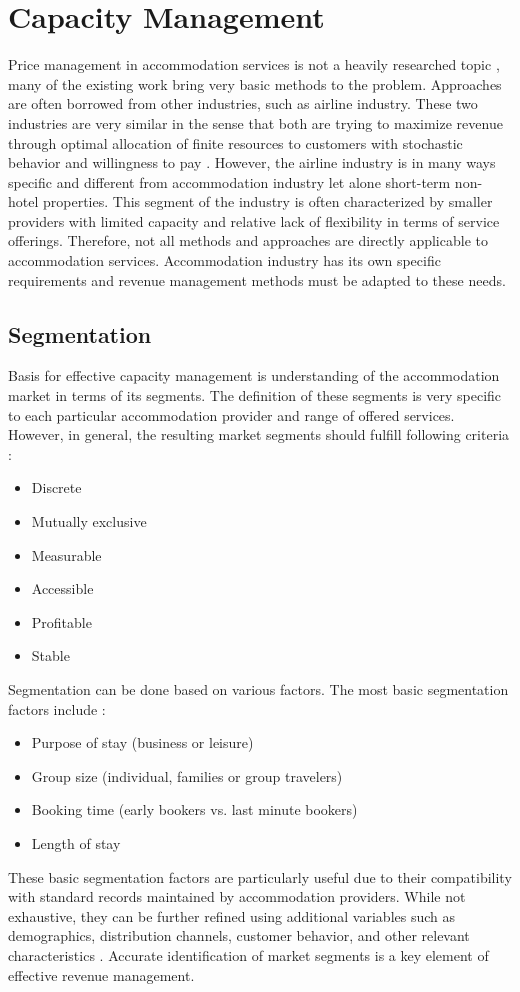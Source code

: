 \section{Capacity Management}

Price management in accommodation services is not a heavily researched topic \cite{AndersonXia2016}, many of the existing work bring very basic methods to the problem. Approaches are often borrowed from other industries, such as airline industry. These two industries are very similar in the sense that both are trying to maximize revenue through optimal allocation of finite resources to customers with stochastic behavior and willingness to pay \cite{Fiori2020}. However, the airline industry is in many ways specific and different from accommodation industry \cite{Bitran2003overview} let alone short-term non-hotel properties. This segment of the industry is often characterized by smaller providers with limited capacity and relative lack of flexibility in terms of service offerings. Therefore, not all methods and approaches are directly applicable to accommodation services. Accommodation industry has its own specific requirements and revenue management methods must be adapted to these needs.

\subsection{Segmentation}

Basis for effective capacity management is understanding of the accommodation market in terms of its segments. The definition of these segments is very specific to each particular accommodation provider and range of offered services. However, in general, the resulting market segments should fulfill following criteria \cite{Ivanov2014}:
\begin{itemize}
    \item Discrete
    \item Mutually exclusive
    \item Measurable
    \item Accessible
    \item Profitable
    \item Stable
\end{itemize}
Segmentation can be done based on various factors. The most basic segmentation factors include \cite{Petricek2021}:
\begin{itemize}
    \item Purpose of stay (business or leisure)
    \item Group size (individual, families or group travelers)
    \item Booking time (early bookers vs. last minute bookers)
    \item Length of stay
\end{itemize}
These basic segmentation factors are particularly useful due to their compatibility with standard records maintained by accommodation providers. While not exhaustive, they can be further refined using additional variables such as demographics, distribution channels, customer behavior, and other relevant characteristics \cite{Ivanov2014}. Accurate identification of market segments is a key element of effective revenue management.

